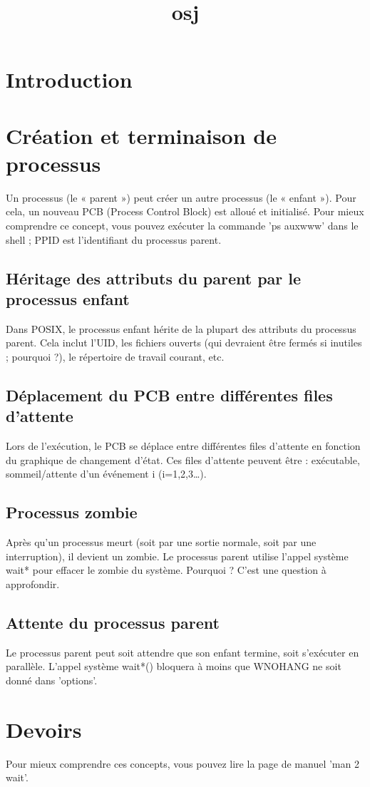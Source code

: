 \documentclass[12pt]{report}
\title{osj}
\author{}
\begin{document}
\maketitle
\tableofcontents
\newpage

\section{Introduction}
  \section{Création et terminaison de processus}  Un processus (le « parent ») peut créer un autre processus (le « enfant »). Pour cela, un nouveau PCB (Process Control Block) est alloué et initialisé. Pour mieux comprendre ce concept, vous pouvez exécuter la commande 'ps auxwww' dans le shell ; PPID est l'identifiant du processus parent.  \subsection{Héritage des attributs du parent par le processus enfant}  Dans POSIX, le processus enfant hérite de la plupart des attributs du processus parent. Cela inclut l'UID, les fichiers ouverts (qui devraient être fermés si inutiles ; pourquoi ?), le répertoire de travail courant, etc.  \subsection{Déplacement du PCB entre différentes files d'attente}  Lors de l'exécution, le PCB se déplace entre différentes files d'attente en fonction du graphique de changement d'état. Ces files d'attente peuvent être : exécutable, sommeil/attente d'un événement i (i=1,2,3…).  \subsection{Processus zombie}  Après qu'un processus meurt (soit par une sortie normale, soit par une interruption), il devient un zombie. Le processus parent utilise l'appel système wait* pour effacer le zombie du système. Pourquoi ? C'est une question à approfondir.  \subsection{Attente du processus parent}  Le processus parent peut soit attendre que son enfant termine, soit s'exécuter en parallèle. L'appel système wait*() bloquera à moins que WNOHANG ne soit donné dans 'options'.  \section{Devoirs}  Pour mieux comprendre ces concepts, vous pouvez lire la page de manuel 'man 2 wait'.  
\end{document}
